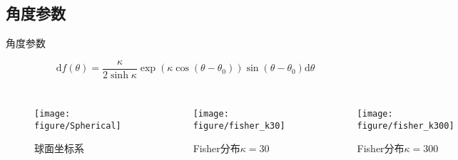 \subsection[Angle]{角度参数}\label{2-2}
\begin{frame}{角度参数}


\begin{equation}\label{equ:fisher}
	\mathrm{d}f(\theta) = \frac{\kappa}{2\sinh\kappa}\exp(\kappa\cos(\theta - \theta_0))\sin(\theta - \theta_0)\mathrm{d}\theta
\end{equation}

\begin{columns}
    \begin{figure}[!htbp]
    	\centering
    	\texttt{[image: figure/Spherical]}
    	\caption{球面坐标系}
    	\label{fig:Spherical}
    \end{figure}
      \begin{figure}[!htbp]
		\centering
			\texttt{[image: figure/fisher\_k30]}
			\caption{Fisher分布$\kappa = 30$}
			\label{fig:fisher_k30}
    	\end{figure}
    	
      \begin{figure}[!htbp]
		\centering
			\texttt{[image: figure/fisher\_k300]}
			\caption{Fisher分布$\kappa = 300$}
			\label{fig:fisher_k300}
    	\end{figure}
\end{columns}
	
\end{frame}

